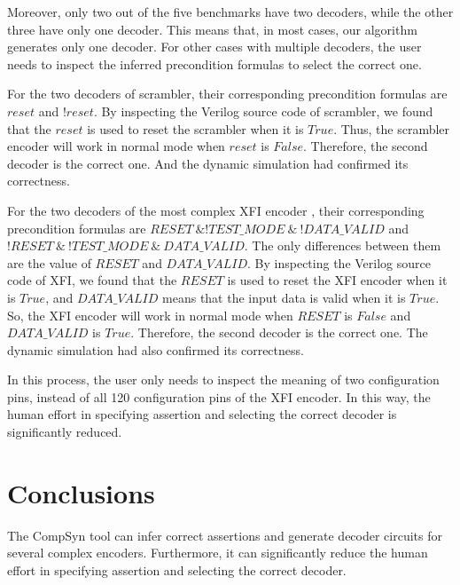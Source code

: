 \documentclass[runningheads,a4paper]{llncs}
\begin{document}
Moreover,
only two out of the five benchmarks have two decoders,
while the other three have only one decoder.
This means that,
in most cases,
our algorithm generates only one decoder.
For other cases with multiple decoders,
the user needs to inspect the inferred precondition formulas to select the correct one.

For the two decoders of scrambler,
their corresponding precondition formulas are $reset$ and $!reset$.
By inspecting the Verilog source code of scrambler,
we found that the $reset$ is used to reset the scrambler when it is $True$.
Thus,
the scrambler encoder will work in normal mode when $reset$ is $False$.
Therefore,
the second decoder is the correct one.
And the dynamic simulation had confirmed its correctness.


For the two decoders of the most complex XFI encoder ,
their corresponding precondition formulas are $RESET~\& !TEST\_MODE~\&~!DATA\_VALID$ and $!RESET~\&~!TEST\_MODE~\&~DATA\_VALID$.
The only differences between them are the value of $RESET$ and $DATA\_VALID$.
By inspecting the Verilog source code of XFI,
we found that the $RESET$ is used to reset the XFI encoder when it is $True$,
and $DATA\_VALID$ means that the input data is valid when it is $True$.
So,
the XFI encoder will work in normal mode when $RESET$ is $False$ and $DATA\_VALID$ is $True$.
Therefore,
the second decoder is the correct one.
The dynamic simulation had also confirmed its correctness.

In this process,
the user only needs to inspect the meaning of two configuration pins,
instead of all 120 configuration pins of the XFI encoder.
In this way,
the human effort in specifying assertion and selecting the correct decoder is significantly reduced.

\section{Conclusions}\label{sec_conclude}
The CompSyn tool can infer correct assertions and generate decoder circuits for several complex encoders.
Furthermore,
it can significantly reduce the human effort in specifying assertion and selecting the correct decoder.









% 
\end{document}
